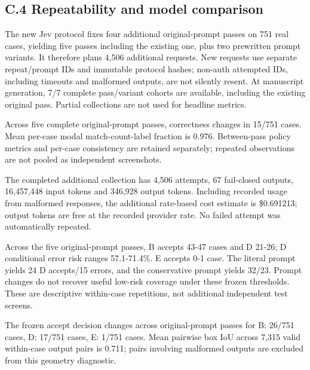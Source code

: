 \documentclass[10pt]{article}
\begin{document}
\subsection*{C.4 Repeatability and model comparison}
The new Jev protocol fixes four additional original-prompt passes on 751 real cases, yielding five passes including the existing one, plus two prewritten prompt variants. It therefore plans 4,506 additional requests. New requests use separate repeat/prompt IDs and immutable protocol hashes; non-auth attempted IDs, including timeouts and malformed outputs, are not silently resent. At manuscript generation, 7/7 complete pass/variant cohorts are available, including the existing original pass. Partial collections are not used for headline metrics.

Across five complete original-prompt passes, correctness changes in 15/751 cases. Mean per-case modal match-count-label fraction is 0.976. Between-pass policy metrics and per-case consistency are retained separately; repeated observations are not pooled as independent screenshots.

The completed additional collection has 4,506 attempts, 67 fail-closed outputs, 16,457,448 input tokens and 346,928 output tokens. Including recorded usage from malformed responses, the additional rate-based cost estimate is \$0.691213; output tokens are free at the recorded provider rate. No failed attempt was automatically repeated.

Across the five original-prompt passes, B accepts 43-47 cases and D 21-26; D conditional error risk ranges 57.1-71.4\%. E accepts 0-1 case. The literal prompt yields 24 D accepts/15 errors, and the conservative prompt yields 32/23. Prompt changes do not recover useful low-risk coverage under these frozen thresholds. These are descriptive within-case repetitions, not additional independent test screens.

The frozen accept decision changes across original-prompt passes for B: 26/751 cases, D: 17/751 cases, E: 1/751 cases. Mean pairwise box IoU across 7,315 valid within-case output pairs is 0.711; pairs involving malformed outputs are excluded from this geometry diagnostic.
\end{document}
